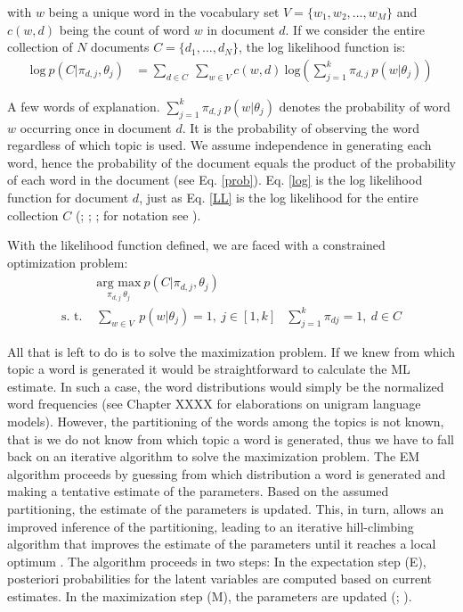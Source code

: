 \documentclass[11pt,a4paper,english,oneside]{book}
\numberwithin{equation}{chapter}
\begin{document}
\noindent with $w$ being a unique word in the vocabulary set $V = \{w_1, w_2, ..., w_M\}$ and $c(w,d)$ being the count of word $w$ in document $d$. If we consider the entire collection of $N$ documents $C=\{d_1,...,d_N\}$, the log likelihood function is:
\begin{align}
\label{LL} \text{log} \ p(C|\pi_{d,j},\theta_j) &= \underset{d \in C}{\sum} \ \underset{w \in V}\sum c(w,d) \ \text{log} \left( \sum_{j=1}^{k}\pi_{d,j} \ p(w|\theta_j) \right)
\end{align}


A few words of explanation. $\sum_{j=1}^{k}\pi_{d,j} \ p(w|\theta_j)$ denotes the probability of word $w$ occurring once in document $d$. It is the probability of observing the word regardless of which topic is used. We assume independence in generating each word, hence the probability of the document equals the product of the probability of each word in the document (see Eq. \ref{prob}). Eq. \ref{log} is the log likelihood function for document $d$, just as Eq. \ref{LL} is the log likelihood for the entire collection $C$ (\citealp{Hofmann.1999}; \citeyear{Hofmann.2001}; \citealp{Steyvers(2007)}; for notation see \citealp[~p. 340--377]{Zhai.2016}).

With the likelihood function defined, we are faced with a constrained optimization problem:
\begin{align}%
 & \underset{\pi_{d,j} \ \theta_j}{\text{arg max}} \ p(C|\pi_{d,j},\theta_j) &\\
\label{constraints} \text{s. t. } & \underset{w \in V}{\sum} \ p(w | \theta_j) = 1, \  j \in [1,k] &  \sum_{j=1}^{k} \pi_{dj} = 1, \ d \in C
\end{align}

All that is left to do is to solve the maximization problem. If we knew from which topic a word is generated it would be straightforward to calculate the ML estimate. In such a case, the word distributions would simply be the normalized word frequencies (see Chapter XXXX for elaborations on unigram language models). However, the partitioning of the words among the topics is not known, that is we do not know from which topic a word is generated, thus we have to fall back on an iterative algorithm to solve the maximization problem. The EM algorithm proceeds by guessing from which distribution a word is generated and making a tentative estimate of the parameters. Based on the assumed partitioning, the estimate of the parameters is updated. This, in turn, allows an improved inference of the partitioning, leading to an iterative hill-climbing algorithm that improves the estimate of the parameters until it reaches a local optimum \cite[p. 360]{Zhai.2016}. The algorithm proceeds in two steps: In the expectation step (E), posteriori probabilities for the latent variables are computed based on current estimates. In the maximization step (M), the parameters are updated (\citealp[p. 290]{Hofmann.1999}; \citeyear[p. 181--182]{Hofmann.1999}). 
\end{document}
